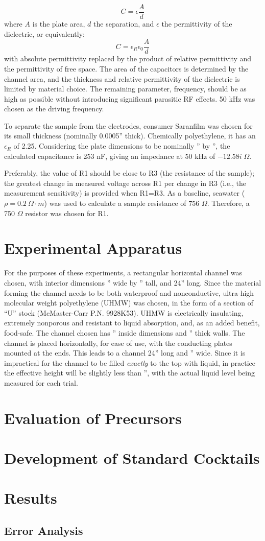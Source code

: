 \documentclass[]{article}
\begin{document}
 \begin{equation}
 C=\epsilon\frac{A}{d}
 \end{equation}
 where $A$ is the plate area, $d$ the separation, and $\epsilon$ the permittivity of the dielectric, or equivalently:
 \begin{equation}
 C=\epsilon_R\epsilon_0\frac{A}{d}
 \end{equation}
with absolute permittivity replaced by the product of relative permittivity and the permittivity of free space.
The area of the capacitors is determined by the channel area, and the thickness and relative permittivity of the dielectric is limited by material choice. The remaining parameter, frequency, should be as high as possible without introducing significant parasitic RF effects. 50 kHz was chosen as the driving frequency.
\par To separate the sample from the electrodes, consumer Saran\textregistered film was chosen for its small thickness (nominally 0.0005'' thick). Chemically polyethylene, it has an $\epsilon_R$ of 2.25. Considering the plate dimensions to be nominally '' by '', the calculated capacitance is 253 nF, giving an impedance at 50 kHz of $-12.58 i\;\Omega$.
\par Preferably, the value of R1 should be close to R3 (the resistance of the sample); the greatest change in measured voltage across R1 per change in R3 (i.e., the measurement sensitivity) is provided when R1=R3. As a baseline, seawater ($\rho=0.2\:\Omega\cdot m$) was used to calculate a sample resistance of 756 $\Omega$. Therefore, a 750 $\Omega$ resistor was chosen for R1.
\section{Experimental Apparatus}
\par For the purposes of these experiments, a rectangular horizontal channel was chosen, with interior dimensions '' wide by '' tall, and 24'' long. Since the material forming the channel needs to be both waterproof and nonconductive,  ultra-high molecular weight polyethylene (UHMW) was chosen, in the form of a section of ``U'' stock (McMaster-Carr P.N. 9928K53). UHMW is electrically insulating, extremely nonporous and resistant to liquid absorption, and, as an added benefit, food-safe. The channel chosen has '' inside dimensions and '' thick walls. The channel is placed horizontally, for ease of use, with the conducting plates mounted at the ends. This leads to a channel 24'' long and '' wide. Since it is impractical for the channel to be filled \textit{exactly} to the top with liquid, in practice the effective height will be slightly less than '', with the actual liquid level being measured for each trial.
\section{Evaluation of Precursors}
\section{Development of Standard Cocktails}
\section{Results}
\subsection{Error Analysis}
\label{sec:error}
\end{document}
